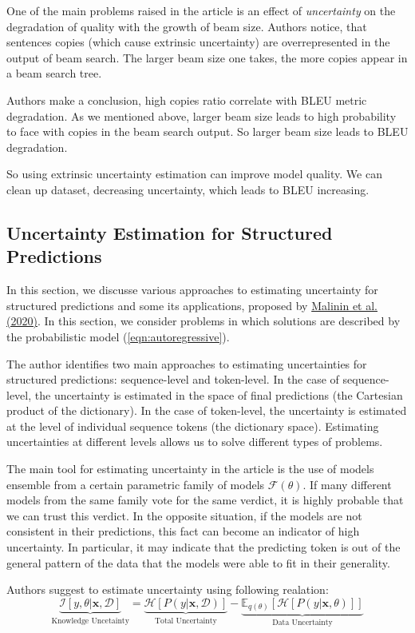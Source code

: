 \documentclass[a4paper,14pt]{extarticle}
\newcommand{\bibref}[3]{\hyperlink{#1}{#2 (#3)}}
\begin{document}
	One of the main problems raised in the article is an effect of \textit{uncertainty} on the degradation of quality with the growth of beam size. Authors notice, that sentences copies (which cause extrinsic uncertainty) are overrepresented in the output of beam search. The larger beam size one takes, the more copies appear in a beam search tree.
	
	Authors make a conclusion, high copies ratio correlate with BLEU metric degradation. As we mentioned above, larger beam size leads to high probability to face with copies in the beam search output. So larger beam size leads to BLEU degradation. 
	
	So using extrinsic uncertainty estimation can improve model quality. We can clean up dataset, decreasing uncertainty, which leads to BLEU increasing.

	\subsection{Uncertainty Estimation for Structured Predictions}
	In this section, we discusse various approaches to estimating uncertainty for structured predictions and some its applications, proposed by \bibref{uncertainty}{Malinin et al.} {2020}. In this section, we consider problems in which solutions are described by the probabilistic model (\ref{eqn:autoregressive}).

	The author identifies two main approaches to estimating uncertainties for structured predictions: sequence-level and token-level. In the case of sequence-level, the uncertainty is estimated in the space of final predictions (the Cartesian product of the dictionary). In the case of token-level, the uncertainty is estimated at the level of individual sequence tokens (the dictionary space). Estimating uncertainties at different levels allows us to solve different types of problems.
	
	The main tool for estimating uncertainty in the article is the use of models ensemble from a certain parametric family of models $\mathcal{F}(\theta)$. If many different models from the same family vote for the same verdict, it is highly probable that we can trust this verdict. In the opposite situation, if the models are not consistent in their predictions, this fact can become an indicator of high uncertainty. In particular, it may indicate that the predicting token is out of the general pattern of the data that the models were able to fit in their generality.

	Authors suggest to estimate uncertainty using following realation:
	\begin{equation}
		\underbrace{\mathcal{I}[y, \theta|\textbf{x}, \mathcal{D}]}_\text{Knowledge Uncetainty}
		= 
		\underbrace{\mathcal{H}[P(y | \textbf{x}, \mathcal{D})]}_\text{Total Uncertainty}
		-
		\underbrace{\mathbb{E}_{q(\theta)}[\mathcal{H}[P(y| \textbf{x}, \theta)]]}_\text{Data Uncertainty}
	\end{equation}
	
\end{document}
